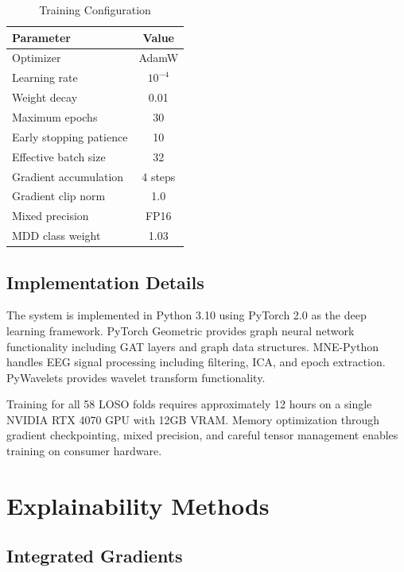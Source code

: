 \documentclass[blue,fullpaper]{ludusofficial}  %
\begin{document}
\begin{table}[h!]
\centering
\caption{Training Configuration}
\label{tab:training}
\begin{tabular}{|l|c|}
\hline
\textbf{Parameter} & \textbf{Value} \\
\hline
Optimizer & AdamW \\
\hline
Learning rate & $10^{-4}$ \\
\hline
Weight decay & 0.01 \\
\hline
Maximum epochs & 30 \\
\hline
Early stopping patience & 10 \\
\hline
Effective batch size & 32 \\
\hline
Gradient accumulation & 4 steps \\
\hline
Gradient clip norm & 1.0 \\
\hline
Mixed precision & FP16 \\
\hline
MDD class weight & 1.03 \\
\hline
\end{tabular}
\end{table}

\subsection{Implementation Details}

The system is implemented in Python 3.10 using PyTorch 2.0 as the deep learning framework. PyTorch Geometric provides graph neural network functionality including GAT layers and graph data structures. MNE-Python handles EEG signal processing including filtering, ICA, and epoch extraction. PyWavelets provides wavelet transform functionality.

Training for all 58 LOSO folds requires approximately 12 hours on a single NVIDIA RTX 4070 GPU with 12GB VRAM. Memory optimization through gradient checkpointing, mixed precision, and careful tensor management enables training on consumer hardware.

\section{Explainability Methods}

\subsection{Integrated Gradients}
\end{document}
